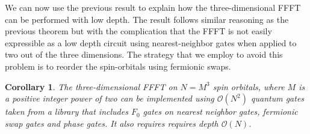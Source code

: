 \documentclass[superscriptaddress,aps,pra,nofootinbib,notitlepage,10pt,longbibliography]{revtex4-1}
\newtheorem{corollary}[theorem]{Corollary}
\begin{document}
We can now use the previous result to explain how the three-dimensional FFFT can be performed with low depth. The result follows similar reasoning as the previous theorem but with the complication that the FFFT is not easily expressible as a low depth circuit using nearest-neighbor gates when applied to two out of the three dimensions.  The strategy that we employ to avoid this problem is to reorder the spin-orbitals using fermionic swaps.
\begin{corollary}
The three-dimensional {\rm FFFT} on $N=M^3$ spin orbitals, where $M$ is a positive integer power of two can be implemented using ${\mathcal{O}}(N^2)$ quantum gates taken from a library that includes $F_0$ gates on nearest neighbor gates, fermionic swap gates and phase gates.  It also requires requires depth ${\mathcal{O}}(N)$.
\end{corollary}
\end{document}
